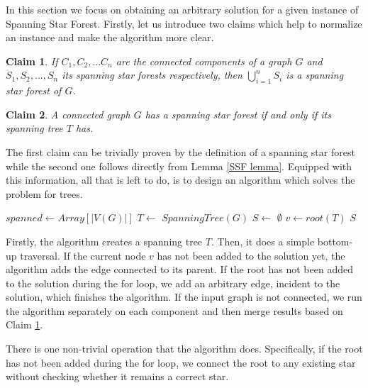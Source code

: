 \documentclass[en]{pracamgr}
\newtheorem{claim}{Claim}
\newcommand{\ssf}{spanning star forest}
\newcommand{\ssfp}{{\sc Spanning Star Forest}}
\begin{document}
In this section we focus on obtaining an arbitrary solution for a given instance of \ssfp{}. Firstly, let us introduce two claims which help to normalize an instance and make the algorithm more clear.

\begin{claim} \label{SSF sum}
	If $C_1,C_2,...C_n$ are the connected components of a graph $G$ and $S_1,S_2,...,S_n$ its \ssf{}s respectively, then $\bigcup\limits_{i=1}^n S_i$ is a \ssf{} of $G$.
\end{claim}

\begin{claim} \label{Spanning tree SSF}
	A connected graph $G$ has a \ssf{} if and only if its spanning tree $T$ has.
\end{claim}

The first claim can be trivially proven by the definition of a \ssf{} while the second one follows directly from Lemma \ref{SSF lemma}. Equipped with this information, all that is left to do, is to design an algorithm which solves the problem for trees.

\begin{algorithm}\label{alg1}
	\KwOut{\ssf{} of $G$}
	$spanned \leftarrow Array[|V(G)|]$\; 
	$T \leftarrow$ $SpanningTree(G)$\;
	$S \leftarrow$ $\emptyset$\;
	$v \leftarrow root(T)$\;
	\Return $S$\;
	\caption{Obtaining a spanning star forest from a connected graph.}
\end{algorithm}

Firstly, the algorithm creates a spanning tree $T$. Then, it does a simple bottom-up traversal. If the current node $v$ has not been added to the solution yet, the algorithm adds the edge connected to its parent. If the root has not been added to the solution during the for loop, we add an arbitrary edge, incident to the solution, which finishes the algorithm. If the input graph is not connected, we run the algorithm separately on each component and then merge results based on Claim \ref{SSF sum}.

There is one non-trivial operation that the algorithm does. Specifically, if the root has not  been added during the for loop, we connect the root to any existing star without checking whether it remains a correct star.
\end{document}
